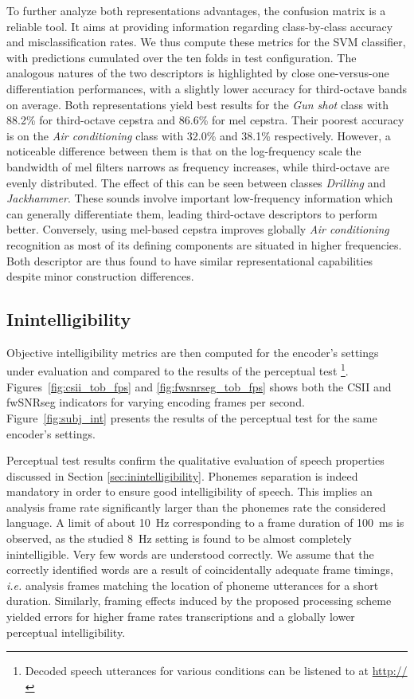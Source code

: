 \documentclass[final,3p,times,twocolumn]{elsarticle}
\begin{document}
To further analyze both representations advantages, the confusion matrix is a reliable tool. It aims at providing information regarding class-by-class accuracy and misclassification rates. We thus compute these metrics for the SVM classifier, with predictions cumulated over the ten folds in test configuration. The analogous natures of the two descriptors is highlighted by close one-versus-one differentiation performances, with a slightly lower accuracy for third-octave bands on average. Both representations yield best results for the \textit{Gun shot} class with 88.2\% for third-octave cepstra and 86.6\% for mel cepstra. Their poorest accuracy is on the \textit{Air conditioning} class with 32.0\% and 38.1\% respectively. However, a noticeable difference between them is that on the log-frequency scale the bandwidth of mel filters narrows as frequency increases, while third-octave are evenly distributed. The effect of this can be seen between classes \textit{Drilling} and \textit{Jackhammer}. These sounds involve important low-frequency information which can generally differentiate them, leading third-octave descriptors to perform better. Conversely, using mel-based cepstra improves globally \textit{Air conditioning} recognition as most of its defining components are situated in higher frequencies.\\

Both descriptor are thus found to have similar representational capabilities despite minor construction differences.


\subsection{Inintelligibility}

Objective intelligibility metrics are then computed for the encoder's settings under evaluation and compared to the results of the perceptual test \footnote{Decoded speech utterances for various conditions can be listened to at \url{http://}}. Figures~\ref{fig:csii_tob_fps} and \ref{fig:fwsnrseg_tob_fps} shows both the CSII and fwSNRseg indicators for varying encoding frames per second. Figure~\ref{fig:subj_int} presents the results of the perceptual test for the same encoder's settings.

Perceptual test results confirm the qualitative evaluation of speech properties discussed in Section \ref{sec:inintelligibility}. Phonemes separation is indeed mandatory in order to ensure good intelligibility of speech. This implies an analysis frame rate significantly larger than the phonemes rate the considered language. A limit of about 10~Hz corresponding to a frame duration of 100~ms is observed, as the studied 8~Hz setting is found to be almost completely inintelligible. Very few words are understood correctly. We assume that the correctly identified words are a result of coincidentally adequate frame timings, \textit{i.e.} analysis frames matching the location of phoneme utterances for a short duration. Similarly, framing effects induced by the proposed processing scheme yielded errors for higher frame rates transcriptions and a globally lower perceptual intelligibility.\\
\end{document}
